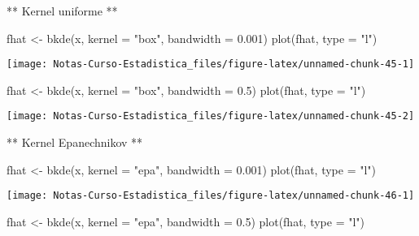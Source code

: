 \documentclass[
  12pt,
]{book}
\newenvironment{Shaded}{\begin{snugshade}}{\end{snugshade}}
\newcommand{\AttributeTok}[1]{\textcolor[rgb]{0.77,0.63,0.00}{#1}}
\newcommand{\FloatTok}[1]{\textcolor[rgb]{0.00,0.00,0.81}{#1}}
\newcommand{\FunctionTok}[1]{\textcolor[rgb]{0.00,0.00,0.00}{#1}}
\newcommand{\NormalTok}[1]{#1}
\newcommand{\OtherTok}[1]{\textcolor[rgb]{0.56,0.35,0.01}{#1}}
\newcommand{\StringTok}[1]{\textcolor[rgb]{0.31,0.60,0.02}{#1}}
\theoremstyle{definition}
\theoremstyle{definition}
\theoremstyle{definition}
\theoremstyle{definition}
\theoremstyle{remark}
\begin{document}
** Kernel uniforme **

\begin{Shaded}
\begin{Highlighting}[]
\NormalTok{fhat }\OtherTok{\textless{}{-}} \FunctionTok{bkde}\NormalTok{(x, }\AttributeTok{kernel =} \StringTok{"box"}\NormalTok{, }\AttributeTok{bandwidth =} \FloatTok{0.001}\NormalTok{)}
\FunctionTok{plot}\NormalTok{(fhat, }\AttributeTok{type =} \StringTok{"l"}\NormalTok{)}
\end{Highlighting}
\end{Shaded}

\begin{center}\texttt{[image: Notas-Curso-Estadistica\_files/figure-latex/unnamed-chunk-45-1]} \end{center}

\begin{Shaded}
\begin{Highlighting}[]
\NormalTok{fhat }\OtherTok{\textless{}{-}} \FunctionTok{bkde}\NormalTok{(x, }\AttributeTok{kernel =} \StringTok{"box"}\NormalTok{, }\AttributeTok{bandwidth =} \FloatTok{0.5}\NormalTok{)}
\FunctionTok{plot}\NormalTok{(fhat, }\AttributeTok{type =} \StringTok{"l"}\NormalTok{)}
\end{Highlighting}
\end{Shaded}

\begin{center}\texttt{[image: Notas-Curso-Estadistica\_files/figure-latex/unnamed-chunk-45-2]} \end{center}

** Kernel Epanechnikov **

\begin{Shaded}
\begin{Highlighting}[]
\NormalTok{fhat }\OtherTok{\textless{}{-}} \FunctionTok{bkde}\NormalTok{(x, }\AttributeTok{kernel =} \StringTok{"epa"}\NormalTok{, }\AttributeTok{bandwidth =} \FloatTok{0.001}\NormalTok{)}
\FunctionTok{plot}\NormalTok{(fhat, }\AttributeTok{type =} \StringTok{"l"}\NormalTok{)}
\end{Highlighting}
\end{Shaded}

\begin{center}\texttt{[image: Notas-Curso-Estadistica\_files/figure-latex/unnamed-chunk-46-1]} \end{center}

\begin{Shaded}
\begin{Highlighting}[]
\NormalTok{fhat }\OtherTok{\textless{}{-}} \FunctionTok{bkde}\NormalTok{(x, }\AttributeTok{kernel =} \StringTok{"epa"}\NormalTok{, }\AttributeTok{bandwidth =} \FloatTok{0.5}\NormalTok{)}
\FunctionTok{plot}\NormalTok{(fhat, }\AttributeTok{type =} \StringTok{"l"}\NormalTok{)}
\end{Highlighting}
\end{Shaded}
\end{document}

